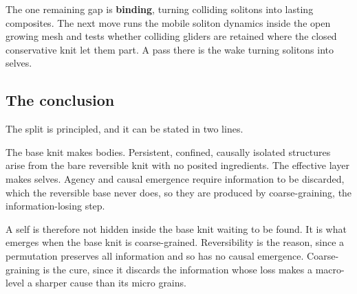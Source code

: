 The one remaining gap is \textbf{binding}, turning colliding solitons into lasting composites. The next move runs the mobile soliton dynamics inside the open growing mesh and tests whether colliding gliders are retained where the closed conservative knit let them part. A pass there is the wake turning solitons into selves.

\subsection{The conclusion}

The split is principled, and it can be stated in two lines.

\begin{result}
The base knit makes bodies. Persistent, confined, causally isolated structures arise from the bare reversible knit with no posited ingredients. The effective layer makes selves. Agency and causal emergence require information to be discarded, which the reversible base never does, so they are produced by coarse-graining, the information-losing step.
\end{result}

A self is therefore not hidden inside the base knit waiting to be found. It is what emerges when the base knit is coarse-grained. Reversibility is the reason, since a permutation preserves all information and so has no causal emergence. Coarse-graining is the cure, since it discards the information whose loss makes a macro-level a sharper cause than its micro grains.
